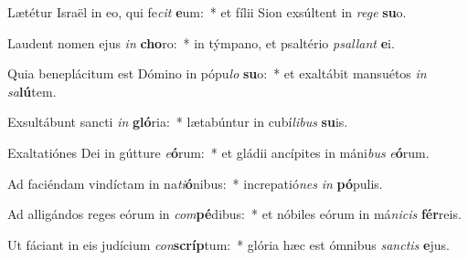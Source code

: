 \item Lætétur Israël in eo, qui fe\textit{cit} \textbf{e}um:~* et fílii Sion exsúltent in \textit{re}\textit{ge} \textbf{su}o.
\item Laudent nomen ejus \textit{in} \textbf{cho}ro:~* in týmpano, et psaltério \textit{psal}\textit{lant} \textbf{e}i.
\item Quia beneplácitum est Dómino in pópu\textit{lo} \textbf{su}o:~* et exaltábit mansuétos \textit{in} \textit{sa}\textbf{lú}tem.
\item Exsultábunt sancti \textit{in} \textbf{gló}ria:~* lætabúntur in cubí\textit{li}\textit{bus} \textbf{su}is.
\item Exaltatiónes Dei in gútture \textit{e}\textbf{ó}rum:~* et gládii ancípites in máni\textit{bus} \textit{e}\textbf{ó}rum.
\item Ad faciéndam vindíctam in na\textit{ti}\textbf{ó}nibus:~* increpatió\textit{nes} \textit{in} \textbf{pó}pulis.
\item Ad alligándos reges eórum in \textit{com}\textbf{pé}dibus:~* et nóbiles eórum in má\textit{ni}\textit{cis} \textbf{fér}reis.
\item Ut fáciant in eis judícium \textit{con}\textbf{scríp}tum:~* glória hæc est ómnibus \textit{sanc}\textit{tis} \textbf{e}jus.
